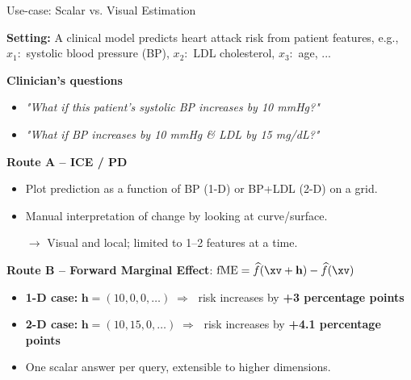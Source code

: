 \documentclass[11pt,compress,t,notes=noshow, aspectratio=169, xcolor=table]{beamer}
\begin{document}
\begin{frame}{Use-case: Scalar vs. Visual Estimation}

\textbf{Setting:}  
A clinical model predicts heart attack risk from patient features, e.g., $x_1:$ systolic blood pressure (BP), $x_2:$ LDL cholesterol, $x_3:$ age, ...

\vspace{0.5em}
\textbf{Clinician’s questions}
\begin{itemize}\setlength\itemsep{0.3em}
  \item \emph{"What if this patient’s systolic BP increases by 10 mmHg?"}
  \item \emph{"What if BP increases by 10 mmHg \& LDL by 15 mg/dL?"}
\end{itemize}

\vspace{0.5em}
\textbf{Route A – ICE / PD}
\begin{itemize}
  \item Plot prediction as a function of BP (1-D) or BP+LDL (2-D) on a grid.
  \item Manual interpretation of change by looking at curve/surface.
  \item[\(\rightarrow\)] Visual and local; limited to 1–2 features at a time.
\end{itemize}

\vspace{0.3em}
\textbf{Route B – Forward Marginal Effect}: $\mathrm{fME}
  = \widehat f(\xv + \mathbf{h}) - \widehat f(\xv)$
\begin{itemize}
  \item \textbf{1-D case:} \(\mathbf{h} = (10, 0, 0, \dots) \;\Rightarrow\;\) risk increases by \textbf{+3 percentage points}
  \item \textbf{2-D case:} \(\mathbf{h} = (10, 15, 0, \dots) \;\Rightarrow\;\) risk increases by \textbf{+4.1 percentage points}
  \item One scalar answer per query, extensible to higher dimensions.
\end{itemize}

\end{frame}

\end{document}
